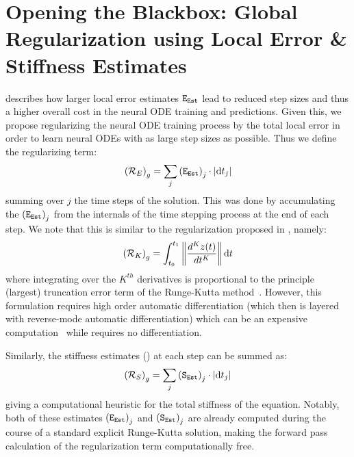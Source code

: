 \section{Opening the Blackbox: Global Regularization using Local Error \& Stiffness Estimates}
\label{sec:global_regularization_using_local_error_and_stiffness_estimates}

 describes how larger local error estimates $\texttt{E}_{\texttt{Est}}$ lead to reduced step sizes and thus a higher overall cost in the neural ODE training and predictions. Given this, we propose regularizing the neural ODE training process by the total local error in order to learn neural ODEs with as large step sizes as possible. Thus we define the regularizing term:
%
\begin{equation}
  \label{eq:reg_eest_global}
  \left(\mathcal{R}_{E}\right)_g = \sum_j \left(\texttt{E}_{\texttt{Est}}\right)_j \cdot |\mathrm{d}t_j|
\end{equation}
%
summing over $j$ the time steps of the solution. This was done by accumulating the $\left(\texttt{E}_{\texttt{Est}}\right)_j$ from the internals of the time stepping process at the end of each step. We note that this is similar to the regularization proposed in \citet{kelly2020learning}, namely:
%
\begin{equation}
  \label{eq:reg_global_kelly}
  \left(\mathcal{R}_{K}\right)_g = \int_{t_0}^{t_1} \left\|\frac{d^K z(t)}{dt^K}\right\| \mathrm{d}t
\end{equation}
%
where integrating over the $K^{th}$ derivatives is proportional to the principle (largest) truncation error term of the Runge-Kutta method~\citep{hairer1}. However, this formulation requires high order automatic differentiation (which then is layered with reverse-mode automatic differentiation) which can be an expensive computation~\citep{zhang2008computing} while  requires no differentiation.

Similarly, the stiffness estimates () at each step can be summed as:
%
\begin{equation}
  \label{eq:reg_stiffness_global}
  \left(\mathcal{R}_{S}\right)_g = \sum_j \left(\texttt{S}_{\texttt{Est}}\right)_j \cdot |\mathrm{d}t_j|
\end{equation}
%
giving a computational heuristic for the total stiffness of the equation. Notably, both of these estimates $\left(\texttt{E}_{\texttt{Est}}\right)_j$ and $\left(\texttt{S}_{\texttt{Est}}\right)_j$ are already computed during the course of a standard explicit Runge-Kutta solution, making the forward pass calculation of the regularization term computationally free.


